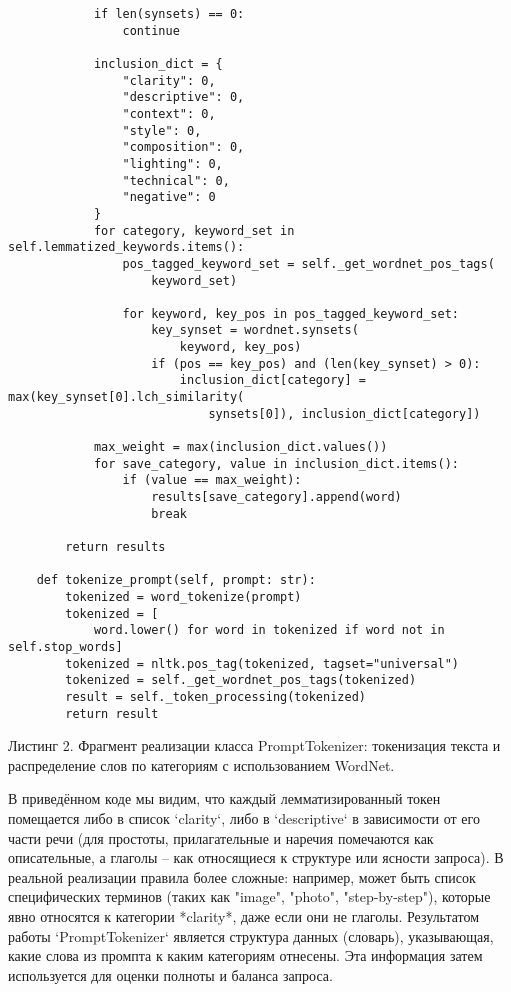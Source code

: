\begin{verbatim}
            if len(synsets) == 0:
                continue

            inclusion_dict = {
                "clarity": 0,
                "descriptive": 0,
                "context": 0,
                "style": 0,
                "composition": 0,
                "lighting": 0,
                "technical": 0,
                "negative": 0
            }
            for category, keyword_set in self.lemmatized_keywords.items():
                pos_tagged_keyword_set = self._get_wordnet_pos_tags(
                    keyword_set)

                for keyword, key_pos in pos_tagged_keyword_set:
                    key_synset = wordnet.synsets(
                        keyword, key_pos)
                    if (pos == key_pos) and (len(key_synset) > 0):
                        inclusion_dict[category] = max(key_synset[0].lch_similarity(
                            synsets[0]), inclusion_dict[category])

            max_weight = max(inclusion_dict.values())
            for save_category, value in inclusion_dict.items():
                if (value == max_weight):
                    results[save_category].append(word)
                    break

        return results

    def tokenize_prompt(self, prompt: str):
        tokenized = word_tokenize(prompt)
        tokenized = [
            word.lower() for word in tokenized if word not in self.stop_words]
        tokenized = nltk.pos_tag(tokenized, tagset="universal")
        tokenized = self._get_wordnet_pos_tags(tokenized)
        result = self._token_processing(tokenized)
        return result
\end{verbatim}
Листинг 2. Фрагмент реализации класса PromptTokenizer: токенизация текста и распределение слов по категориям с использованием WordNet.

В приведённом коде мы видим, что каждый лемматизированный токен помещается либо в список `clarity`, либо в `descriptive` в зависимости от его части речи (для простоты, прилагательные и наречия помечаются как описательные, а глаголы – как относящиеся к структуре или ясности запроса). В реальной реализации правила более сложные: например, может быть список специфических терминов (таких как "image", "photo", "step-by-step"), которые явно относятся к категории *clarity*, даже если они не глаголы. Результатом работы `PromptTokenizer` является структура данных (словарь), указывающая, какие слова из промпта к каким категориям отнесены. Эта информация затем используется для оценки полноты и баланса запроса.

